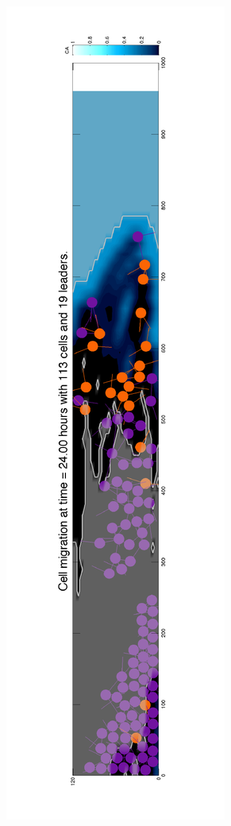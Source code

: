 \documentclass[portrait,a0paper,fontscale=0.292]{baposter}
\begin{document}
\begin{poster}
{\begin{minipage}{250pt}
	\includegraphics[trim=68 30 40 200, clip,scale=0.35,angle=270]{modelWithinBack-crop}%
	\end{minipage}
	\vspace*{-7pt}
	}  


\end{poster}
\end{document}
